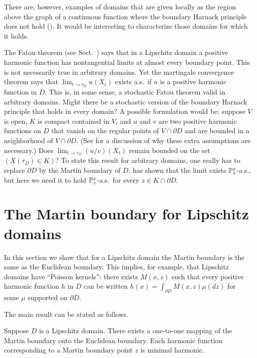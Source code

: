 There are, however, examples of domains that are given locally as the region above the graph of a continuous function where the boundary Harnack principle does not hold (\cite{BassBurdzy1991}). It would be interesting to characterize those domains for which it holds.

The Fatou theorem (see Sect.\ ) says that in a Lipschitz domain a positive harmonic function has nontangential limits at almost every boundary point. This is not necessarily true in arbitrary domains. Yet the martingale convergence theorem says that $\lim_{t\to\tau_D}u(X_t)$ exists a.s.\ if $u$ is a positive harmonic function in $D$. This is, in some sense, a stochastic Fatou theorem valid in arbitrary domains. Might there be a stochastic version of the boundary Harnack principle that holds in every domain? A possible formulation would be: suppose $V$ is open, $K$ is compact contained in $V$, and $u$ and $v$ are two positive harmonic functions on $D$ that vanish on the regular points of $V \cap \partial D$ and are bounded in a neighborhood of $V \cap \partial D$. (See \cite{BassBurdzy1991} for a discussion of why these extra assumptions are necessary.) Does $\lim_{t\to\tau_D}(u/v)(X_t)$ remain bounded on the set $(X(\tau_D) \in K)$? To state this result for arbitrary domains, one really has to replace $\partial D$ by the Martin boundary of $D$. \cite{Doob1957} has shown that the limit exists $\P_z^x$-a.s., but here we need it to hold $\P_z^x$-a.s.\ for every $z \in K \cap \partial D$.

\mnewpage

\section{The Martin boundary for Lipschitz domains}\label{ch3_sec2}


In this section we show that for a Lipschitz domain the Martin boundary is the same as the Euclidean boundary. This implies, for example, that Lipschitz domains have ``Poisson kernels'': there exists $M(x,z)$ such that every positive harmonic function $h$ in $D$ can be written $h(x) = \int_{\partial D} M(x,z)\mu(dz)$ for some $\mu$ supported on $\partial D$.

The main result can be stated as follows.

\begin{theorem}\label{thm:ch3_2.1}
Suppose $D$ is a Lipschitz domain. There exists a one-to-one mapping of the Martin boundary onto the Euclidean boundary. Each harmonic function corresponding to a Martin boundary point $z$ is minimal harmonic.
\end{theorem}


